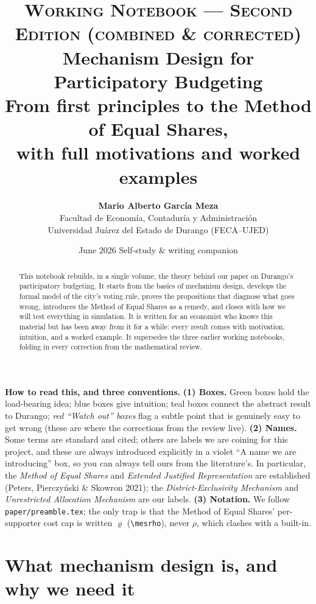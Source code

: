 \documentclass[11pt,letterpaper]{article}
\title{%
  \vspace{-0.8cm}
  {\large\scshape Working Notebook --- Second Edition (combined \& corrected)}\\[0.6em]
  {\LARGE\bfseries Mechanism Design for\\[0.2em] Participatory Budgeting}\\[0.5em]
  {\large From first principles to the Method of Equal Shares,\\[0.2em]
  with full motivations and worked examples}
}
\author{\textbf{Mario Alberto Garc\'ia Meza}\\[2pt]
  \small Facultad de Econom\'ia, Contadur\'ia y Administraci\'on\\
  \small Universidad Ju\'arez del Estado de Durango (FECA--UJED)}
\date{June 2026 \;\textbullet\; Self-study \& writing companion}
\theoremstyle{definition}
\theoremstyle{plain}
\theoremstyle{remark}
\newcommand{\mesrho}{\varrho}      %
\providecommand{\citealp}[1]{Peters, Pierczy\'nski \& Skowron 2021}
\begin{document}
\maketitle
\thispagestyle{fancy}

\begin{abstract}
\noindent This notebook rebuilds, in a single volume, the theory behind our paper on
Durango's participatory budgeting. It starts from the basics of mechanism design, develops
the formal model of the city's voting rule, proves the propositions that diagnose what goes
wrong, introduces the Method of Equal Shares as a remedy, and closes with how we will test
everything in simulation. It is written for an economist who knows this material but has been
away from it for a while: every result comes with motivation, intuition, and a worked example.
It supersedes the three earlier working notebooks, folding in every correction from the
mathematical review.
\end{abstract}

\begin{aside}
\small\textbf{How to read this, and three conventions.}
\textbf{(1) Boxes.} Green boxes hold the load-bearing idea; blue boxes give intuition; teal
boxes connect the abstract result to Durango; \emph{red ``Watch out'' boxes} flag a subtle
point that is genuinely easy to get wrong (these are where the corrections from the review
live). \textbf{(2) Names.} Some terms are standard and cited; others are labels we are coining
for this project, and these are always introduced explicitly in a violet ``A name we are
introducing'' box, so you can always tell ours from the literature's. In particular, the
\emph{Method of Equal Shares} and \emph{Extended Justified Representation} are established
(\citealp{peters2021}); the \emph{District-Exclusivity Mechanism} and \emph{Unrestricted
Allocation Mechanism} are our labels. \textbf{(3) Notation.} We follow \texttt{paper/preamble.tex};
the only trap is that the Method of Equal Shares' per-supporter cost cap is written $\mesrho$
(\texttt{\textbackslash mesrho}), never $\rho$, which clashes with a built-in.
\end{aside}

\tableofcontents
\newpage

\section{What mechanism design is, and why we need it}
\label{sec:what}
\end{document}
